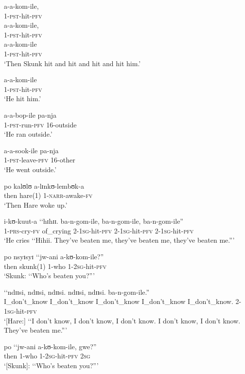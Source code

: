 \begin{exe}
\ex \gll a-a-kom-ile,\\
1-\textsc{pst}-hit-\textsc{pfv}\\
\ex \gll a-a-kom-ile,\\
1-\textsc{pst}-hit-\textsc{pfv}\\
\ex \gll a-a-kom-ile\\
1-\textsc{pst}-hit-\textsc{pfv}\\
\glt \lq Then Skunk hit and hit and hit and hit him.' 

\ex \gll a-a-kom-ile\\
1-\textsc{pst}-hit-\textsc{pfv}\\
\glt \lq He hit him.'

\ex \gll a-a-bop-ile pa-nja\\
1-\textsc{pst}-run-\textsc{pfv} 16-outside\\
\glt \lq He ran outside.'

\ex \gll a-a-sook-ile pa-nja\\
1-\textsc{pst}-leave-\textsc{pfv} 16-other\\
\glt \lq He went outside.'

\ex \gll po kalʊlʊ a-lɪnkʊ-lembʊk-a\\
then hare(1) 1-\textsc{narr}-awake-\textsc{fv}\\
\glt \lq Then Hare woke up.'

\ex \gll i-kʊ-kuut-a \lq \lq hɪhɪɪ. ba-n-gom-ile, ba-n-gom-ile, ba-n-gom-ile''\\
1-\textsc{prs}-cry-\textsc{fv} \phantom{\lq\lq}of\_crying 2-\textsc{1sg}-hit-\textsc{pfv} 2-\textsc{1sg}-hit-\textsc{pfv} 2-\textsc{1sg}-hit-\textsc{pfv}\\
\glt \lq He cries \lq\lq Hihii. They've beaten me, they've beaten me, they've beaten me.''{}'


\ex \gll po nsyɪsyɪ \lq\lq jw-ani a-kʊ-kom-ile?''\\
then skunk(1) \phantom{\lq\lq}1-who 1-\textsc{2sg}-hit-\textsc{pfv}\\
\glt \lq Skunk: \lq\lq Who's beaten you?''{}'

\ex \gll \lq\lq ndɪɪsi, ndɪɪsi, ndɪɪsi. ndɪɪsi, ndɪɪsi. ba-n-gom-ile.''\\
\phantom{\lq\lq}I\_don't\_know I\_don't\_know I\_don't\_know I\_don't\_know I\_don't\_know. 2-\textsc{1sg}-hit-\textsc{pfv}\\
\glt \lq [Hare:] \lq\lq I don't know, I don't know, I don't know. I don't know, I don't know. They've beaten me.''{}'

\ex \gll po \lq\lq jw-ani a-kʊ-kom-ile, gwe?''\\
then \phantom{\lq\lq}1-who 1-\textsc{2sg}-hit-\textsc{pfv} \textsc{2sg}\\
\glt \lq [Skunk]: \lq\lq Who's beaten you?''{}'


\end{exe}
